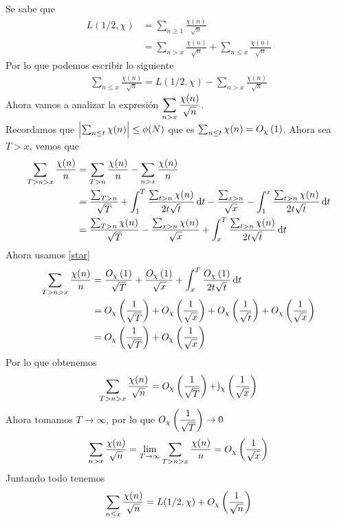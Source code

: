 \begin{sol}
	Se sabe que
	\begin{align*}
		L(1/2,\chi) & =\sum_{n\geq1}\frac{\chi(n)}{\sqrt{n}}                                     \\
		            & =\sum_{n>x}\frac{\chi(n)}{\sqrt{n}}+\sum_{n\leq x}\frac{\chi(n)}{\sqrt{n}}
	\end{align*}
	Por lo que podemos escribir lo siguiente
	\begin{align*}
		\sum_{n\leq x}\frac{\chi(n)}{\sqrt{n}}=L(1/2,\chi)-\sum_{n>x}\frac{\chi(n)}{\sqrt{n}}
	\end{align*}
	Ahora vamos a analizar la expresión $\ds\sum_{n>x}\frac{\chi(n)}{\sqrt{n}}$.\\
	Recordamos que $\abs{\sum_{n\leq t}\chi(n)}\leq\phi(N)$ que es $\sum_{n\leq t}\chi(n)=\BigO[\chi]{1}\label{star}$. Ahora sea $T>x$, vemos que
	\begin{align*}
		\sum_{T>n>x}\frac{\chi(n)}{n} & =\sum_{T>n}\frac{\chi(n)}{n}-\sum_{n>x}\frac{\chi(n)}{n}                                                                                                     \\
		                              & =\frac{\sum_{T>n}}{\sqrt{T}}+\int_1^T\frac{\sum_{t>n}\chi(n)}{2t\sqrt{t}}\d{t}-\frac{\sum_{x>n}}{\sqrt{x}}-\int_1^x\frac{\sum_{t>n}\chi(n)}{2t\sqrt{t}}\d{t} \\
		                              & =\frac{\sum_{T>n}\chi(n)}{\sqrt{T}}-\frac{\sum_{x>n}\chi(n)}{\sqrt{x}}+\int_x^T\frac{\sum_{t>n}\chi(n)}{2t\sqrt{t}}\d{t}
	\end{align*}
	Ahora usamos \eqref{star}
	\begin{align*}
		\sum_{T>n>x}\frac{\chi(n)}{n} & = \frac{\BigO[\chi]{1}}{\sqrt{T}}+\frac{\BigO[\chi]{1}}{\sqrt{x}}+\int_x^T\frac{\BigO[\chi]{1}}{2t\sqrt{t}}\d{t}         \\
		                              & =\BigO[\chi]{\frac1{\sqrt{T}}}+\BigO[\chi]{\frac1{\sqrt{x}}}+\BigO[\chi]{\frac1{\sqrt{t}}}+\BigO[\chi]{\frac1{\sqrt{x}}} \\
		                              & =\BigO[\chi]{\frac1{\sqrt{T}}}+\BigO[\chi]{\frac1{\sqrt{x}}}
	\end{align*}
	Por lo que obtenemos
	\begin{equation*}
		\sum_{T>n>x}\frac{\chi(n)}{\sqrt{n}}=\BigO[\chi]{\frac1{\sqrt{T}}}+)_\chi\paren{\frac1{\sqrt{x}}}
	\end{equation*}
	Ahora tomamos $T\rightarrow\infty$, por lo que $\BigO[\chi]{\dfrac1{\sqrt{T}}}\rightarrow0$
	\begin{equation*}
		\sum_{n>x}\frac{\chi(n)}{\sqrt{n}}=\lim_{T\rightarrow\infty}\sum_{T>n>x}\frac{\chi(n)}{n}=\BigO[\chi]{\frac1{\sqrt{x}}}
	\end{equation*}
	Juntando todo tenemos
	\begin{equation*}
		\sum_{n\leq x}\frac{\chi(n)}{\sqrt{n}}=L(1/2,\chi)+\BigO[\chi]{\frac1{\sqrt{n}}}
	\end{equation*}
\end{sol}

